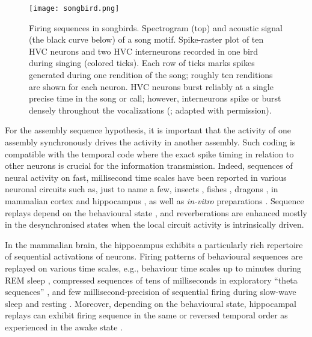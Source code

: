     \begin{figure}
      \center
      \texttt{[image: songbird.png]}
      \caption{Firing sequences in songbirds. Spectrogram (top) and acoustic
        signal (the black curve below) of a song motif. Spike-raster plot of
        ten HVC neurons and two HVC interneurons recorded in one bird during
        singing (colored ticks). Each row of ticks marks spikes generated
        during one rendition of the song; roughly ten renditions are shown for
        each neuron. HVC neurons burst reliably at a single precise time in the
        song or call; however, interneurons spike or burst densely throughout
        the vocalizations (\citealp{Hahnloser2002}; adapted with permission).
             }
    \label{fig:songbird}
    \end{figure}

    For the assembly sequence hypothesis, it is important that the activity of
    one assembly synchronously drives the activity in another assembly. Such
    coding is compatible with the temporal code where the exact spike timing in
    relation to other neurons is crucial for the information transmission.
    Indeed, sequences of neural activity on fast, millisecond time scales have
    been reported in various neuronal circuits such as, just to name a few,
    insects \citep{Fushiki2016}, fishes \citep{Romano2015}, dragons
    \citep{Shein2016}, in mammalian cortex \citep{Euston2007} and hippocampus
    \citep{Lee2002}, as well as {\it in-vitro} preparations \citep{Mao2001,
    Segev2004, MacLean2005, Kruskal2013}. Sequence replays depend on the
    behavioural state \citep{Almeida2014}, and reverberations are enhanced mostly
    in the desynchronised states \citep{Contreras2013, Buzsaki1983} when the
    local circuit activity is intrinsically driven. 

    In the mammalian brain, the hippocampus exhibits a particularly rich
    repertoire of sequential activations of neurons. Firing patterns of
    behavioural sequences are replayed on various time scales, e.g., behaviour
    time scales up to minutes during REM sleep \citep{Louie2001}, compressed
    sequences of tens of milliseconds in exploratory ``theta sequences''
    \citep{Skaggs1996, Dragoi2006, Gupta2012, Feng2015}, and few
    millisecond-precision of sequential firing during slow-wave sleep and
    resting \citep{Lee2002}. Moreover, depending on the behavioural state,
    hippocampal replays can exhibit firing sequence in the same or reversed
    temporal order as experienced in the awake state \citep{Foster2006}.

